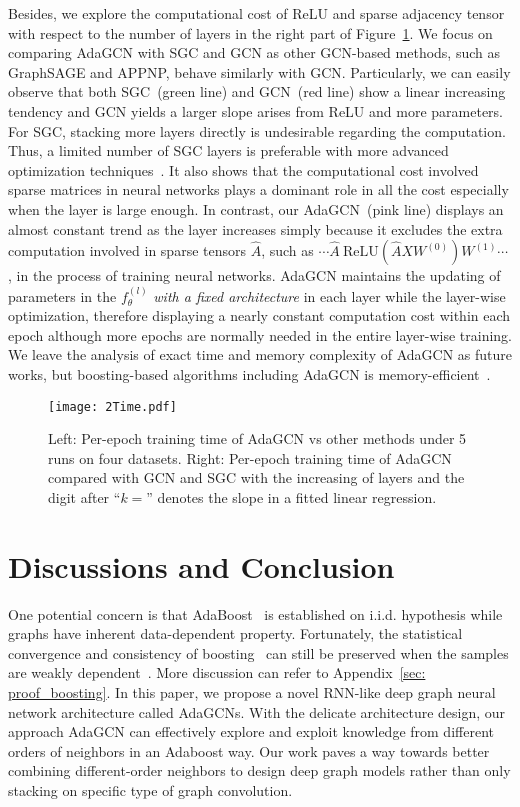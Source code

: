 \documentclass{article} \usepackage{iclr2021_conference,times}
\begin{document}
Besides, we explore the computational cost of ReLU and sparse adjacency tensor with respect to the number of layers in the right part of Figure~\ref{figure_time}. We focus on comparing AdaGCN with SGC and GCN as other GCN-based methods, such as GraphSAGE and APPNP, behave similarly with GCN. Particularly, we can easily observe that both SGC~(green line) and GCN~(red line) show a linear increasing tendency and GCN yields a larger slope arises from ReLU and more parameters. For SGC, stacking more layers directly is undesirable regarding the computation. Thus, a limited number of SGC layers is preferable with more advanced optimization techniques~\cite{wu2019simplifying}. It also shows that the computational cost involved sparse matrices in neural networks plays a dominant role in all the cost especially when the layer is large enough. In contrast, our AdaGCN~(pink line) displays an almost constant trend as the layer increases simply because it excludes the extra computation involved in sparse tensors $\hat{A}$, such as $\cdots \hat{A} \ \text{ReLU}(\hat{A}XW^{(0)}) W^{(1)} \cdots$, in the process of training neural networks. AdaGCN maintains the updating of parameters in the $f_{\theta}^{(l)}$ \textit{with a fixed architecture} in each layer while the layer-wise optimization, therefore displaying a nearly constant computation cost within each epoch although more epochs are normally needed in the entire layer-wise training. We leave the analysis of exact time and memory complexity of AdaGCN as future works, but boosting-based algorithms including AdaGCN is memory-efficient~\citep{oono2020optimization}.

\begin{figure}[t!]
\centering
	\texttt{[image: 2Time.pdf]}
	\caption{Left: Per-epoch training time of AdaGCN vs other methods under 5 runs on four datasets. Right: Per-epoch training time of AdaGCN compared with GCN and SGC with the increasing of layers and the digit after ``$k=$'' denotes the slope in a fitted linear regression.}
	\label{figure_time}
\end{figure}

\section{Discussions and Conclusion} 


One potential concern is that AdaBoost~\citep{hastie2009multi,freund1999short} is established on i.i.d. hypothesis while graphs have inherent data-dependent property. Fortunately, the statistical convergence and consistency of boosting~\citep{lugosi2001bayes,mannor2003greedy} can still be preserved when the samples are weakly dependent~\citep{lozano2013convergence}. More discussion can refer to  Appendix~\ref{sec: proof_boosting}. In this paper, we propose a novel RNN-like deep graph neural network architecture called AdaGCNs. With the delicate architecture design, our approach AdaGCN can effectively explore and exploit knowledge from different orders of neighbors in an Adaboost way. Our work paves a way towards better combining different-order neighbors to design deep graph models rather than only stacking on specific type of graph convolution.
\end{document}

